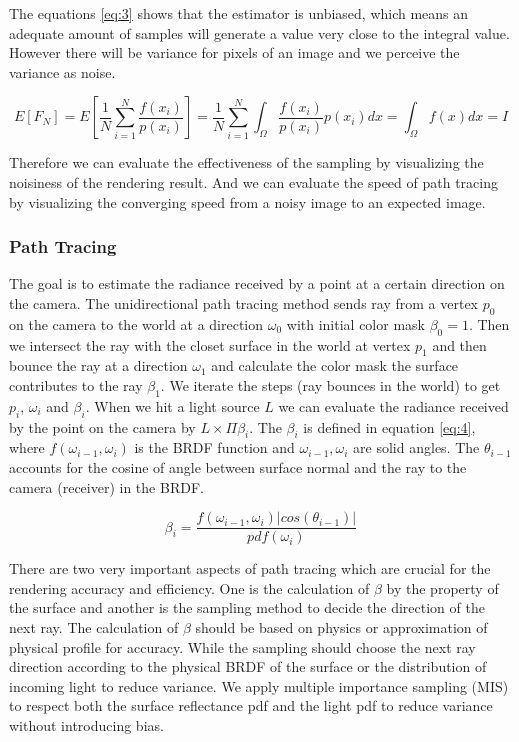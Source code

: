 \documentclass[letterpaper,12pt]{article}
\begin{document}
The equations \ref{eq:3} shows that the estimator is unbiased, which means an adequate amount of samples will generate a value very close to the integral value. However there will be variance for pixels of an image and we perceive the variance as noise.

\begin{equation} \label{eq:3}
    E[F_N] = E[\frac{1}{N}\sum_{i=1}^N\frac{f(x_i)}{p(x_i)}]
           = \frac{1}{N}\sum_{i=1}^N\int_\Omega\frac{f(x_i)}{p(x_i)}p(x_i)dx
           = \int_\Omega f(x)dx
           = I
\end{equation}

Therefore we can evaluate the effectiveness of the sampling by visualizing the noisiness of the rendering result. And we can evaluate the speed of path tracing by visualizing the converging speed from a noisy image to an expected image.

\subsubsection{Path Tracing}
The goal is to estimate the radiance received by a point at a certain direction on the camera. The unidirectional path tracing method sends ray from a vertex $p_0$ on the camera to the world at a direction $\omega_0$ with initial color mask $\beta_0 = 1$. Then we intersect the ray with the closet surface in the world at vertex $p_1$ and then bounce the ray at a direction $\omega_1$ and calculate the color mask the surface contributes to the ray $\beta_1$. We iterate the steps (ray bounces in the world) to get $p_i$, $\omega_i$ and $\beta_i$. When we hit a light source $L$ we can evaluate the radiance received by the point on the camera by $L \times \Pi \beta_i$. The $\beta_i$ is defined in equation \ref{eq:4}, where $f(\omega_{i-1}, \omega_i)$ is the BRDF function and $\omega_{i-1}, \omega_i$ are solid angles. The $\theta_{i-1}$ accounts for the cosine of angle between surface normal and the ray to the camera (receiver) in the BRDF\cite{kajiya1986rendering}.

\begin{equation} \label{eq:4}
    \beta_i = \frac{f(\omega_{i-1}, \omega_i)|cos(\theta_{i-1})|}{pdf(\omega_i)}
\end{equation}

There are two very important aspects of path tracing which are crucial for the rendering accuracy and efficiency. One is the calculation of $\beta$ by the property of the surface and another is the sampling method to decide the direction of the next ray. The calculation of $\beta$ should be based on physics or approximation of physical profile for accuracy. While the sampling should choose the next ray direction according to the physical BRDF of the surface or the distribution of incoming light to reduce variance. We apply multiple importance sampling (MIS) to respect both the surface reflectance pdf and the light pdf to reduce variance without introducing bias.
\end{document}
